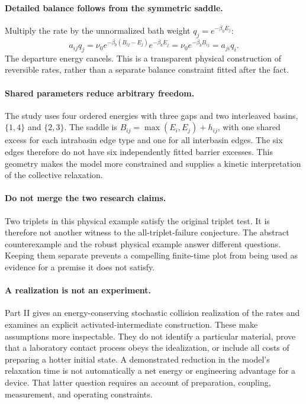 \documentclass[11pt]{article}
\begin{document}
\paragraph{Detailed balance follows from the symmetric saddle.}
Multiply the rate by the unnormalized bath weight $q_j=e^{-\beta_b E_j}$:
\[
a_{ij}q_j
=\nu_0e^{-\beta_b(B_{ij}-E_j)}e^{-\beta_b E_j}
=\nu_0e^{-\beta_b B_{ij}}
=a_{ji}q_i.
\]
The departure energy cancels. This is a transparent physical construction
of reversible rates, rather than a separate balance constraint fitted
after the fact.

\paragraph{Shared parameters reduce arbitrary freedom.}
The study uses four ordered energies with three gaps and two interleaved
basins, $\{1,4\}$ and $\{2,3\}$. The saddle is
$B_{ij}=\max(E_i,E_j)+h_{ij}$, with one shared excess for each intrabasin
edge type and one for all interbasin edges. The six edges therefore do not
have six independently fitted barrier excesses. This geometry makes the
model more constrained and supplies a kinetic interpretation of the
collective relaxation.

\paragraph{Do not merge the two research claims.}
Two triplets in this physical example satisfy the original triplet test.
It is therefore not another witness to the all-triplet-failure conjecture.
The abstract counterexample and the robust physical example answer
different questions. Keeping them separate prevents a compelling finite-time
plot from being used as evidence for a premise it does not satisfy.

\paragraph{A realization is not an experiment.}
Part II gives an energy-conserving stochastic collision realization of the
rates and examines an explicit activated-intermediate construction. These
make assumptions more inspectable. They do not identify a particular
material, prove that a laboratory contact process obeys the idealization,
or include all costs of preparing a hotter initial state. A demonstrated
reduction in the model's relaxation time is not automatically a net energy
or engineering advantage for a device. That latter question requires an
account of preparation, coupling, measurement, and operating constraints.
\end{document}
